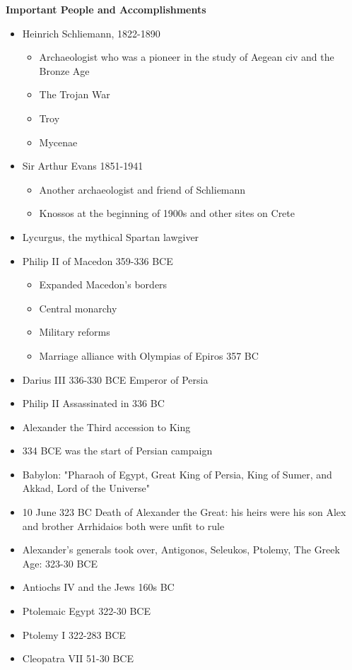 \documentclass[12pt,a4paper]{report}
\begin{document}
\textbf{Important People and Accomplishments}
\begin{itemize}
\item Heinrich Schliemann, 1822-1890
\begin{itemize}
\item Archaeologist who was a pioneer in the study of Aegean civ and the Bronze Age
\item The Trojan War
\item Troy
\item Mycenae
\end{itemize}
\item Sir Arthur Evans 1851-1941
\begin{itemize}
\item Another archaeologist and friend of Schliemann
\item Knossos at the beginning of 1900s and other sites on Crete
\end{itemize}
\item Lycurgus, the mythical Spartan lawgiver
\item Philip II of Macedon 359-336 BCE
\begin{itemize}
\item Expanded Macedon's borders
\item Central monarchy
\item Military reforms
\item Marriage alliance with Olympias of Epiros 357 BC
\end{itemize}
\item Darius III 336-330 BCE Emperor of Persia
\item Philip II Assassinated in 336 BC
\item Alexander the Third accession to King
\item 334 BCE was the start of Persian campaign
\item Babylon: "Pharaoh of Egypt, Great King of Persia, King of Sumer, and Akkad, Lord of the Universe"
\item 10 June 323 BC Death of Alexander the Great: his heirs were his son Alex and brother Arrhidaios both were unfit to rule
\item Alexander's generals took over, Antigonos, Seleukos, Ptolemy, The Greek Age: 323-30 BCE
\item Antiochs IV and the Jews 160s BC
\item Ptolemaic Egypt 322-30 BCE
\item Ptolemy I 322-283 BCE
\item Cleopatra VII 51-30 BCE
\end{itemize}
\end{document}
